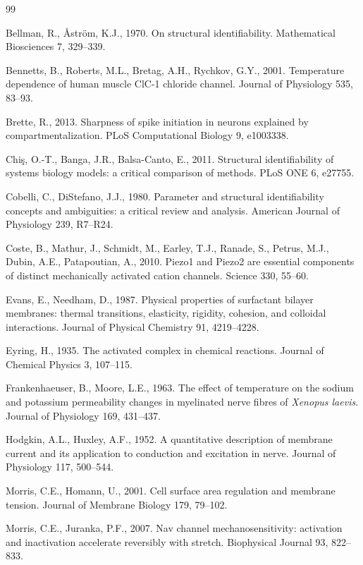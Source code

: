 \begin{thebibliography}{99}

Bellman, R., {\AA}str{\"o}m, K.J., 1970.
On structural identifiability.
Mathematical Biosciences 7, 329--339.

Bennetts, B., Roberts, M.L., Bretag, A.H., Rychkov, G.Y., 2001.
Temperature dependence of human muscle ClC-1 chloride channel.
Journal of Physiology 535, 83--93.

Brette, R., 2013.
Sharpness of spike initiation in neurons explained by compartmentalization.
PLoS Computational Biology 9, e1003338.

Chi{\c s}, O.-T., Banga, J.R., Balsa-Canto, E., 2011.
Structural identifiability of systems biology models: a critical comparison of
methods.
PLoS ONE 6, e27755.

Cobelli, C., DiStefano, J.J., 1980.
Parameter and structural identifiability concepts and ambiguities: a critical
review and analysis.
American Journal of Physiology 239, R7--R24.

Coste, B., Mathur, J., Schmidt, M., Earley, T.J., Ranade, S., Petrus, M.J.,
Dubin, A.E., Patapoutian, A., 2010.
Piezo1 and Piezo2 are essential components of distinct mechanically activated
cation channels.
Science 330, 55--60.

Evans, E., Needham, D., 1987.
Physical properties of surfactant bilayer membranes: thermal transitions,
elasticity, rigidity, cohesion, and colloidal interactions.
Journal of Physical Chemistry 91, 4219--4228.

Eyring, H., 1935.
The activated complex in chemical reactions.
Journal of Chemical Physics 3, 107--115.

Frankenhaeuser, B., Moore, L.E., 1963.
The effect of temperature on the sodium and potassium permeability changes in
myelinated nerve fibres of \emph{Xenopus laevis}.
Journal of Physiology 169, 431--437.

Hodgkin, A.L., Huxley, A.F., 1952.
A quantitative description of membrane current and its application to conduction
and excitation in nerve.
Journal of Physiology 117, 500--544.

Morris, C.E., Homann, U., 2001.
Cell surface area regulation and membrane tension.
Journal of Membrane Biology 179, 79--102.

Morris, C.E., Juranka, P.F., 2007.
Nav channel mechanosensitivity: activation and inactivation accelerate
reversibly with stretch.
Biophysical Journal 93, 822--833.


\end{thebibliography}
